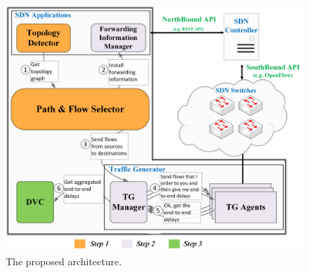 \documentclass[10pt, journal, letterpaper]{IEEEtran}
\begin{document}
\begin{figure}
    \centering
    \includegraphics[width=\columnwidth]{img/architecture.png}
    \caption{The proposed architecture.}
    \label{fig:Architecture}
\end{figure}
\end{document}
